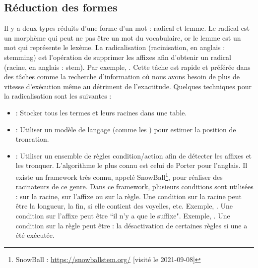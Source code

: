 \documentclass{KodeBook}
\begin{document}
\subsection{Réduction des formes}

Il y a deux types réduits d'une forme d'un mot : radical et lemme. 
Le radical est un morphème qui peut ne pas être un mot du vocabulaire, or le lemme est un mot qui représente le lexème.
La radicalisation (racinisation, en anglais : stemming) est l'opération de supprimer les affixes afin d'obtenir un radical (racine, en anglais : stem). 
Par exemple, . 
Cette tâche est rapide et préférée dans des tâches comme la recherche d'information où nous avons besoin de plus de vitesse d'exécution même au détriment de l'exactitude. 
Quelques techniques pour la radicalisation sont les suivantes :
\begin{itemize}
	\item {} : Stocker tous les termes et leurs racines dans une table. 
	\item {} : Utiliser un modèle de langage (comme les ) pour estimer la position de troncation.
	\item {} : Utiliser un ensemble de règles condition/action afin de détecter les affixes et les tronquer. 
	L'algorithme le plus connu est celui de Porter \cite{1980-porter} pour l'anglais. 
	Il existe un framework très connu, appelé SnowBall\footnote{SnowBall : \url{https://snowballstem.org/} [visité le 2021-09-08]}, pour réaliser des racinateurs de ce genre. 
	Dans ce framework, plusieurs conditions sont utilisées : sur la racine, sur l'affixe ou sur la règle. 
	Une condition sur la racine peut être la longueur, la fin, si elle contient des voyelles, etc.
	Exemple, .
	Une condition sur l'affixe peut être ``il n'y a que le suffixe".
	Exemple, .
	Une condition sur la règle peut être : la désactivation de certaines règles si une a été exécutée.
\end{itemize}
\end{document}
